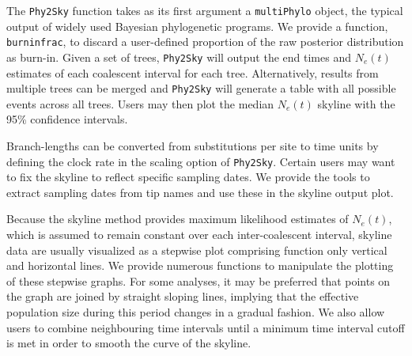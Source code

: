 \documentclass[english,titlepage]{article}
\begin{document}
The \texttt{Phy2Sky} function takes as its first argument a \texttt{multiPhylo} object, the typical output of widely used Bayesian phylogenetic programs. We provide a function, \texttt{burninfrac}, to discard a user-defined proportion of the raw posterior distribution as burn-in. Given a set of trees, \texttt{Phy2Sky} will output the end times and $N_e(t)$ estimates of each coalescent interval for each tree. Alternatively, results from multiple trees can be merged and \texttt{Phy2Sky} will generate a table with all possible events across all trees. Users may then plot the median $N_e(t)$ skyline with the 95\% confidence intervals.

Branch-lengths can be converted from substitutions per site to time units by defining the clock rate in the scaling option of \texttt{Phy2Sky}. Certain users may want to fix the skyline to reflect specific sampling dates. We provide the tools to extract sampling dates from tip names and use these in the skyline output plot.

Because the skyline method provides maximum likelihood estimates of $N_e(t)$, which is assumed to remain constant over each inter-coalescent interval, skyline data are usually visualized as a stepwise plot comprising function only vertical and horizontal lines. We provide numerous functions to manipulate the plotting of these stepwise graphs. For some analyses, it may be preferred that points on the graph are joined by straight sloping lines, implying that the effective population size during this period changes in a gradual fashion. We also allow users to combine neighbouring time intervals until a minimum time interval cutoff is met in order to smooth the curve of the skyline. 

  
\end{document}
